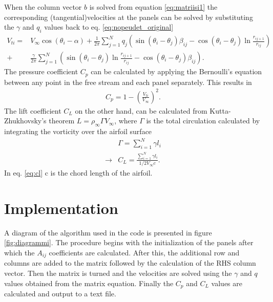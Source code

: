 \documentclass[a4paper,12pt]{article}
\begin{document}
When the column vector $b$ is solved from equation \ref{eq:matriisi1} the corresponding (tangential)velocities at the panels can be solved by substituting the $\gamma$ and $q_i$ values back to eq. \ref{eq:nopeudet_original}
\begin{equation}
\begin{split}
V_{ti} = &V_{\infty} \cos(\theta_i - \alpha) + \frac{1}{2\pi} \sum_{j=1}^N q_j\left( \sin(\theta_i - \theta_j) \beta_{ij}-\cos(\theta_i - \theta_j) \ln \frac{r_{ij+1}}{r_{ij}}\right)\\
+& \frac{\gamma}{2\pi} \sum_{j=1}^N \left( \sin(\theta_i - \theta_j) \ln \frac{r_{ij+1}}{r_{ij}}-\cos(\theta_i - \theta_j) \beta_{ij}\right).
\end{split}
\label{eq:nopeudet_final}
\end{equation}
The pressure coefficient $C_p$ can be calculated by applying the Bernoulli's equation between any point in the free stream and each panel separately. This results in 
\begin{equation}
\begin{split}
C_p = 1 - (\frac{V_{ti}}{V_\infty})^2.
\end{split}
\label{eq:cp}
\end{equation}
The lift coefficient $C_L$ on the other hand, can be calculated from Kutta-Zhukhovsky's theorem $L = \rho_\infty \Gamma V_\infty$, where $\Gamma$ is the total circulation calculated by integrating the vorticity over the airfoil surface
\begin{equation}
\begin{split}
&\Gamma = \sum_{i=1}^N \gamma l_i\\
\rightarrow &C_L = \frac{\sum_{i=1}^N \gamma l_i}{1/2 V_\infty c}.
\end{split}
\label{eq:cl}
\end{equation}
In eq. \ref{eq:cl} c is the chord length of the airfoil.
\newpage
\section{Implementation}
A diagram of the algorithm used in the code is presented in figure \ref{fig:diagrammi}. The procedure begins with the initialization of the panels after which the $A_{ij}$ coefficients are calculated. After this, the additional row and columns are added to the matrix followed by the calculation of the RHS column vector. Then the matrix is turned and the velocities are solved using the $\gamma$ and $q$ values obtained from the matrix equation. Finally the $C_p$ and $C_L$ values are calculated and output to a text file.
\end{document}
